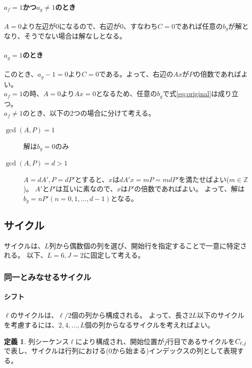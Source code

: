 \documentclass[a4paper,11pt,dvipdfmx]{jsarticle}
\theoremstyle{definition}
\newtheorem{definition}{定義}[section]
\begin{document}
\paragraph{$a_f=1$かつ$a_g \neq1$のとき}
$A=0$より左辺が0になるので、右辺が0、すなわち$C=0$であれば任意の$b_g $が解となり、そうでない場合は解なしとなる。

\paragraph{$a_g =1$のとき\\}
このとき、$a_g -1=0$より$C=0$である。よって、右辺の$Ax$が$P$の倍数であればよい。\\
$a_f=1$の時、$A=0$より$Ax=0$となるため、任意の$b_g $で式\ref{eq:original}は成り立つ。\\
$a_f\neq 1$のとき、以下の2つの場合に分けて考える。
\begin{description}
  \item[$\gcd(A, P)=1$]
    解は$b_g =0$のみ
  \item[$\gcd(A, P)=d>1$]
    $A = dA', P = dP'$とすると、$x$は$dA'x=mP=mdP'$を満たせばよい($m\in\mathbb{Z}$)。
    $A'$と$P'$は互いに素なので、$x$は$P'$の倍数であればよい。
    よって、解は$b_g =nP'(n=0,1,\dots,d-1)$となる。
\end{description}

\subsection{サイクル}\label{ssec:cycle}
サイクルは、$L$列から偶数個の列を選び、開始行を指定することで一意に特定される。
以下、$L=6, J=2$に固定して考える。

\subsubsection{同一とみなせるサイクル}\label{ssec:samecycle}
\paragraph{シフト}\label{para:shift}
$\ell$のサイクルは、$\ell / 2$個の列から構成される。
よって、長さ$2L$以下のサイクルを考慮するには、$2,4,\dots,L$個の列からなるサイクルを考えればよい。
\begin{definition}
  列シーケンス$\ell$により構成され、開始位置が$j$行目であるサイクルを$C_{{\ell},{j}}$で表し、サイクルは行列における(0から始まる)インデックスの列として表現する。
\end{definition}
\end{document}
